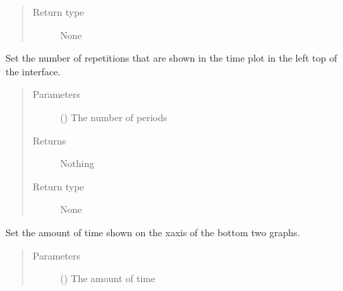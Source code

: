 \documentclass[letterpaper,10pt,english]{sphinxmanual}
\begin{document}
\begin{fulllineitems}
\begin{fulllineitems}
\begin{quote}
\begin{description}
\item[{Return type}] \leavevmode
\sphinxAtStartPar
None

\end{description}\end{quote}

\end{fulllineitems}


\begin{fulllineitems}
\label{\detokenize{index:TiePieLCR_settings.TiePieLCR_settings.set_plot_periods}}
\sphinxAtStartPar
Set the number of repetitions that are shown in the time plot in the left top of the interface.
\begin{quote}\begin{description}
\item[{Parameters}] \leavevmode
\sphinxAtStartPar
{} () \textendash{} The number of periods

\item[{Returns}] \leavevmode
\sphinxAtStartPar
Nothing

\item[{Return type}] \leavevmode
\sphinxAtStartPar
None

\end{description}\end{quote}

\end{fulllineitems}


\begin{fulllineitems}
\label{\detokenize{index:TiePieLCR_settings.TiePieLCR_settings.set_plot_time}}
\sphinxAtStartPar
Set the amount of time shown on the x\sphinxhyphen{}axis of the bottom two graphs.
\begin{quote}\begin{description}
\item[{Parameters}] \leavevmode
\sphinxAtStartPar
{} () \textendash{} The amount of time


\end{description}
\end{quote}
\end{fulllineitems}
\end{fulllineitems}
\end{document}

